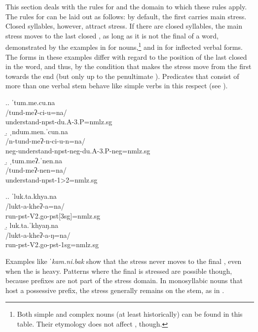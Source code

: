 \largerpage[-1]
This section deals with the rules for  and the domain to which these rules apply.
The rules for  can be laid out as follows: by default, the first  carries main stress. Closed syllables, however, attract stress. If there are closed syllables, the main stress moves to the last closed , as long as it is not the final  of a word, demonstrated by the examples in  for nouns,\footnote{Both simple and complex nouns (at least historically) can be found in this table. Their etymology does not affect , though.} and in \Next for inflected verbal forms. The forms in these examples differ with regard to the position of the last closed  in the word, and thus, by the condition that makes the stress move from the first  towards the end (but only up to the penultimate ). Predicates that consist of more than one verbal stem behave like simple verbs in this respect (see \NNext). 







\ex.\a. \glll ˈtum.me.cu.na\\
/tund-meʔ-ci-u=na/\\
understand{\sc -npst-du.A-3.P=nmlz.sg}\\
\b. \glll ˌndum.men.ˈcun.na\\
/n-tund-meʔ-n-ci-u-n=na/\label{str-ex1}\\
{\sc neg-}understand{\sc -npst-neg-du.A-3.P-neg=nmlz.sg}\\
\b. \glll ˌtum.meʔ.ˈnen.na\label{str-ex2}\\
/tund-meʔ-nen=na/\\
understand{\sc -npst-1>2=nmlz.sg}\\

\ex.\a. \glll ˈluk.ta.khya.na\\
/lukt-a-kheʔ-a=na/\\
run{\sc -pst-V2.go-pst[3sg]=nmlz.sg}\\
\newpage
\b. \glll luk.ta.ˈkhyaŋ.na\\
/lukt-a-kheʔ-a-ŋ=na/\\
run{\sc -pst-V2.go-pst-1sg=nmlz.sg}\\

Examples like \emph{ˈkam.ni.bak}  show that the stress never moves to the final , even when the  is heavy. Patterns where the final  is stressed are possible though, because prefixes are not part of the stress domain. In monosyllabic nouns that host a possessive prefix, the stress generally remains on the stem, as in  \Next.


